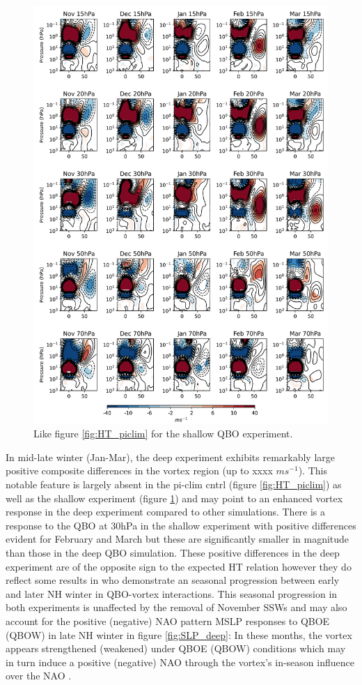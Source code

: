 \begin{figure}[h!]
\begin{center}
\noindent\includegraphics[width = 0.8\linewidth]{Figures/Figures-deepQBO/ZMZW_composites_by_month_QBO_phases_U_s_MarQBO_vs_Mar_70hPa_5thresh.png}
\caption[ZMZW composites under different QBO phases in the shallow QBO simulation]{Like figure \ref{fig:HT_piclim} for the shallow QBO experiment.}
\label{fig:HT_shallow}
\end{center}
\end{figure}
\newpage 

In mid-late winter (Jan-Mar), the deep experiment exhibits remarkably large positive composite differences in the vortex region (up to xxxx $ms^{-1}$). This notable feature is largely absent in the pi-clim cntrl (figure \ref{fig:HT_piclim}) as well as the shallow experiment (figure \ref{fig:HT_shallow}) and may point to an enhanced vortex response in the deep experiment compared to other simulations. There is a response to the QBO at 30hPa in the shallow experiment with positive differences evident for February and March but these are significantly smaller in magnitude than those in the deep QBO simulation. These positive differences in the deep experiment are of the opposite sign to the expected HT relation however they do reflect some results in \cite{graySurface2018b} who demonstrate an seasonal progression between early and later NH winter in QBO-vortex interactions. This seasonal progression in both experiments is unaffected by the removal of November SSWs and may also account for the positive (negative) NAO pattern MSLP responses to QBOE (QBOW) in late NH winter in figure \ref{fig:SLP_deep}: In these months, the vortex appears strengthened (weakened) under QBOE (QBOW) conditions which may in turn induce a positive (negative) NAO through the vortex's in-season influence over the NAO \citep{charlton-perezInfluence2018e}. 

